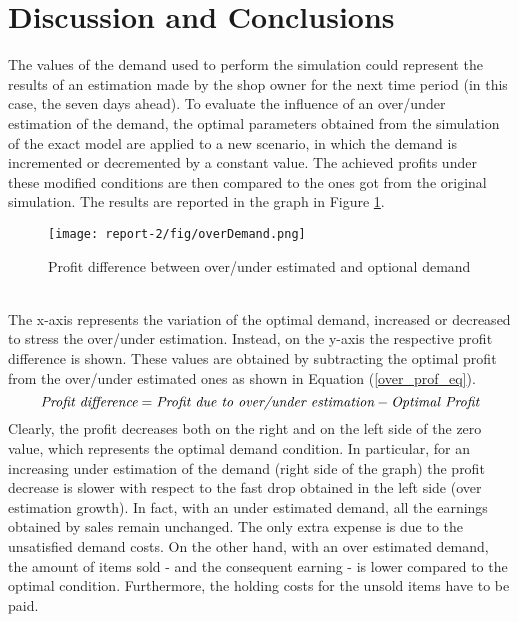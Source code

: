 \documentclass{article}
\begin{document}
\section{Discussion and Conclusions}\label{sec:conclusions}
The values of the demand used to perform the simulation could represent the results of an estimation made by the shop owner for the next time period (in this case, the seven days ahead). To evaluate the influence of an over/under estimation of the demand, the optimal parameters obtained from the simulation of the exact model are applied to a new scenario, in which the demand is incremented or decremented by a constant value. The  achieved profits under these modified conditions are then compared to the ones got from the original simulation. The results are reported in the graph in Figure \ref{fig:overDemand}.
\begin{figure}[!htb]
    \centering
    \texttt{[image: report-2/fig/overDemand.png]}
    \caption{Profit difference between over/under estimated and optional demand}
    \label{fig:overDemand}
\end{figure}\\
The x-axis represents the variation of the optimal demand, increased or decreased to stress the over/under estimation. Instead, on the y-axis the respective profit difference is shown. These values are obtained by subtracting the optimal profit from the over/under estimated ones as shown in Equation (\ref{over_prof_eq}). 
\begin{equation}
   \textit{Profit difference} = \textit{Profit due to over/under estimation} - \textit{Optimal Profit} \\ \label{over_prof_eq}
\end{equation}
Clearly, the profit decreases both on the right and on the left side of the zero value, which represents the optimal demand condition. In particular, for an increasing under estimation of the demand (right side of the graph) the profit decrease is slower with respect to the fast drop obtained in the left side (over estimation growth). In fact, with an under estimated demand, all the earnings obtained by sales remain unchanged. 
The only extra expense is due to the unsatisfied demand costs. On the other hand, with an over estimated demand, the amount of items sold - and the consequent earning - is lower compared to the optimal condition. Furthermore, the holding costs for the unsold items have to be paid. \par 
\end{document}
